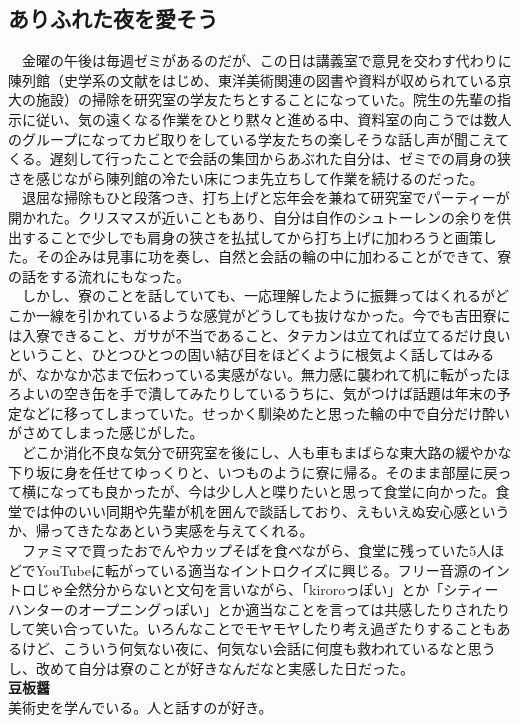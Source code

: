 \begin{myboxnote}
\subsection{ありふれた夜を愛そう}
\noindent
　金曜の午後は毎週ゼミがあるのだが、この日は講義室で意見を交わす代わりに陳列館（史学系の文献をはじめ、東洋美術関連の図書や資料が収められている京大の施設）の掃除を研究室の学友たちとすることになっていた。院生の先輩の指示に従い、気の遠くなる作業をひとり黙々と進める中、資料室の向こうでは数人のグループになってカビ取りをしている学友たちの楽しそうな話し声が聞こえてくる。遅刻して行ったことで会話の集団からあぶれた自分は、ゼミでの肩身の狭さを感じながら陳列館の冷たい床につま先立ちして作業を続けるのだった。\\
　退屈な掃除もひと段落つき、打ち上げと忘年会を兼ねて研究室でパーティーが開かれた。クリスマスが近いこともあり、自分は自作のシュトーレンの余りを供出することで少しでも肩身の狭さを払拭してから打ち上げに加わろうと画策した。その企みは見事に功を奏し、自然と会話の輪の中に加わることができて、寮の話をする流れにもなった。\\
　しかし、寮のことを話していても、一応理解したように振舞ってはくれるがどこか一線を引かれているような感覚がどうしても抜けなかった。今でも吉田寮には入寮できること、ガサが不当であること、タテカンは立てれば立てるだけ良いということ、ひとつひとつの固い結び目をほどくように根気よく話してはみるが、なかなか芯まで伝わっている実感がない。無力感に襲われて机に転がったほろよいの空き缶を手で潰してみたりしているうちに、気がつけば話題は年末の予定などに移ってしまっていた。せっかく馴染めたと思った輪の中で自分だけ酔いがさめてしまった感じがした。\\
　どこか消化不良な気分で研究室を後にし、人も車もまばらな東大路の緩やかな下り坂に身を任せてゆっくりと、いつものように寮に帰る。そのまま部屋に戻って横になっても良かったが、今は少し人と喋りたいと思って食堂に向かった。食堂では仲のいい同期や先輩が机を囲んで談話しており、えもいえぬ安心感というか、帰ってきたなあという実感を与えてくれる。\\
　ファミマで買ったおでんやカップそばを食べながら、食堂に残っていた5人ほどでYouTubeに転がっている適当なイントロクイズに興じる。フリー音源のイントロじゃ全然分からないと文句を言いながら、「kiroroっぽい」とか「シティーハンターのオープニングっぽい」とか適当なことを言っては共感したりされたりして笑い合っていた。いろんなことでモヤモヤしたり考え過ぎたりすることもあるけど、こういう何気ない夜に、何気ない会話に何度も救われているなと思うし、改めて自分は寮のことが好きなんだなと実感した日だった。\\

\vspace{1mm}
\noindent
\textbf{豆板醤}\\
美術史を学んでいる。人と話すのが好き。

\end{myboxnote}
\vspace{1em}

